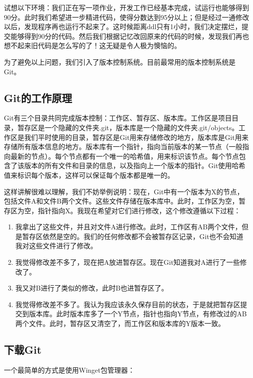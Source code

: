 \documentclass[../main.tex]{subfiles}
\begin{document}
试想以下环境：我们正在写一项作业，开发工作已经基本完成，试运行也能够得到90分。此时我们希望进一步精进代码，使得分数达到95分以上；但是经过一通修改以后，发现程序再也运行不起来了。这时候距离ddl只有1小时，我们决定摆烂，提交能够得到90分的代码。然后我们根据记忆改回原来的代码的时候，发现我们再也想不起来旧代码是怎么写的了！这无疑是令人极为懊恼的。

为了避免以上问题，我们引入了版本控制系统。目前最常用的版本控制系统是Git。

\subsection{Git的工作原理}

Git有三个目录共同完成版本控制：工作区、暂存区、版本库。工作区是项目目录，暂存区是一个隐藏的文件夹.git，版本库是一个隐藏的文件夹.git/objects。工作区是我们平时使用的目录，暂存区是Git用来存储修改的地方，版本库是Git用来存储所有版本信息的地方。版本库有一个指针，指向当前版本的某一节点（一般指向最新的节点）。每个节点都有一个唯一的哈希值，用来标识该节点。每个节点包含了该版本的所有文件和目录的信息，以及指向上一个版本的指针。Git使用哈希值来标识每个版本，这样可以保证每个版本都是唯一的。

这样讲解很难以理解，我们不妨举例说明：现在，Git中有一个版本为X的节点，包括文件A和文件B两个文件。这些文件存储在版本库中。此时，工作区为空，暂存区为空，指针指向X。我现在希望对它们进行修改，这个修改遵循以下过程：

\begin{enumerate}
    \item 我拿出了这些文件，并且对文件A进行修改。此时，工作区有AB两个文件，但是暂存区依然是空的。我们的任何修改都不会被暂存区记录，Git也不会知道我对这些文件进行了修改。
    \item 我觉得修改差不多了，现在把A放进暂存区。现在Git知道我对A进行了一些修改了。
    \item 我又对B进行了类似的修改，此时B也进暂存区了。
    \item 我觉得修改差不多了。我认为我应该永久保存目前的状态，于是就把暂存区提交到版本库。此时版本库多了一个Y节点，指针也指向Y节点，有修改过的AB两个文件。此时，暂存区又清空了，而工作区和版本库的Y版本一致。
\end{enumerate}

\subsection{下载Git}

一个最简单的方式是使用Winget包管理器：
\end{document}

